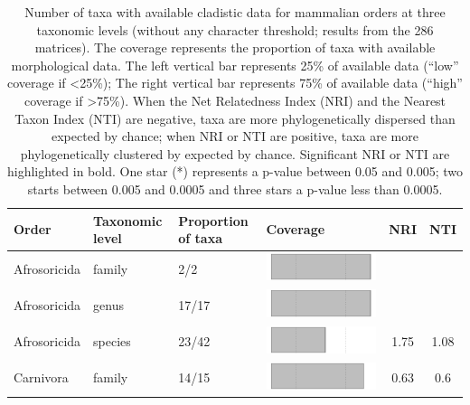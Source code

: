 \begin{longtable}{lL{1.8cm}C{2cm}lcc}
\caption[Number of taxa with available cladistic data for mammalian orders without any character threshold]{Number of taxa with available cladistic data for mammalian orders at three taxonomic levels (without any character threshold; results from the 286 matrices). The coverage represents the proportion of taxa with available morphological data. The left vertical bar represents 25\% of available data (``low'' coverage if \textless 25\%); The right vertical bar represents 75\% of available data (``high'' coverage if \textgreater 75\%). When the Net Relatedness Index (NRI) and the Nearest Taxon Index (NTI) are negative, taxa are more phylogenetically dispersed than expected by chance; when NRI or NTI are positive, taxa are more phylogenetically clustered by expected by chance. Significant NRI or NTI are highlighted in bold. One star (*) represents a p-value between 0.05 and 0.005; two starts between 0.005 and 0.0005 and three stars a p-value less than 0.0005.} \\ 
  \hline
Order & Taxonomic level & Proportion of taxa & Coverage & NRI & NTI \\ 
  \hline
Afrosoricida & family & 2/2 & \includegraphics[width=0.20\linewidth, height=0.05\linewidth]{Supplementaries/Figures/MissingMammals/Results_1c/Table_figures/bar1.pdf} &   &   \\ 
  Afrosoricida & genus & 17/17 & \includegraphics[width=0.20\linewidth, height=0.05\linewidth]{Supplementaries/Figures/MissingMammals/Results_1c/Table_figures/bar2.pdf} &   &   \\ 
  Afrosoricida & species & 23/42 & \includegraphics[width=0.20\linewidth, height=0.05\linewidth]{Supplementaries/Figures/MissingMammals/Results_1c/Table_figures/bar3.pdf} & 1.75 & 1.08 \\ 
  Carnivora & family & 14/15 & \includegraphics[width=0.20\linewidth, height=0.05\linewidth]{Supplementaries/Figures/MissingMammals/Results_1c/Table_figures/bar4.pdf} & 0.63 & 0.6 \\ 

\end{longtable}
